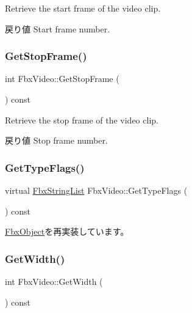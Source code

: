 Retrieve the start frame of the video clip. \begin{DoxyReturn}{戻り値}
Start frame number. 
\end{DoxyReturn}
\mbox{\label{class_fbx_video_a8b6b7be05e339cfe47998674269242e7}} 
\subsubsection{\texorpdfstring{Get\+Stop\+Frame()}{GetStopFrame()}}
{\footnotesize\ttfamily int Fbx\+Video\+::\+Get\+Stop\+Frame (\begin{DoxyParamCaption}{ }\end{DoxyParamCaption}) const}

Retrieve the stop frame of the video clip. \begin{DoxyReturn}{戻り値}
Stop frame number. 
\end{DoxyReturn}
\mbox{\label{class_fbx_video_a69adf09a2346176545e330cd2c8f23ad}} 
\subsubsection{\texorpdfstring{Get\+Type\+Flags()}{GetTypeFlags()}}
{\footnotesize\ttfamily virtual \hyperlink{class_fbx_string_list}{Fbx\+String\+List} Fbx\+Video\+::\+Get\+Type\+Flags (\begin{DoxyParamCaption}{ }\end{DoxyParamCaption}) const\hspace{0.3cm}{\ttfamily [virtual]}}



\hyperlink{class_fbx_object_a6d30a5d00400039a248977cf9f9255b2}{Fbx\+Object}を再実装しています。

\mbox{\label{class_fbx_video_a9ad08f6d0da0e76353dc6250f1321093}} 
\subsubsection{\texorpdfstring{Get\+Width()}{GetWidth()}}
{\footnotesize\ttfamily int Fbx\+Video\+::\+Get\+Width (\begin{DoxyParamCaption}{ }\end{DoxyParamCaption}) const}

